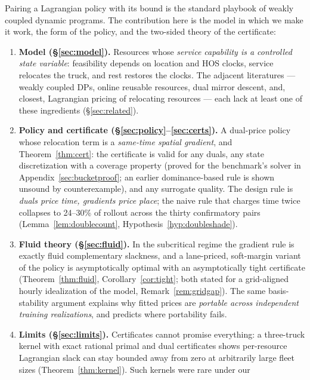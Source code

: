 \documentclass[11pt]{article}
\begin{document}
Pairing a Lagrangian policy with its bound is the standard playbook of
weakly coupled dynamic programs. The contribution here is the model in
which we make it work, the form of the policy, and the two-sided theory
of the certificate:

\begin{enumerate}
\item \textbf{Model (\S\ref{sec:model}).} Resources whose \emph{service
  capability is a controlled state variable}: feasibility depends on
  location and HOS clocks, service relocates the truck, and rest
  restores the clocks. The adjacent literatures --- weakly coupled
  DPs, online reusable resources, dual mirror descent, and, closest,
  Lagrangian pricing of relocating resources
  \citep{balseirobrownchen2021relocating} --- each lack at
  least one of these ingredients (\S\ref{sec:related}).
\item \textbf{Policy and certificate
  (\S\ref{sec:policy}--\ref{sec:certs}).} A dual-price policy whose
  relocation term is a \emph{same-time spatial gradient}, and
  Theorem~\ref{thm:cert}: the certificate is valid for any duals, any
  state discretization with a coverage property (proved for the
  benchmark's solver in Appendix~\ref{sec:bucketproof}; an earlier
  dominance-based rule is shown unsound by counterexample), and any
  surrogate quality. The design
  rule is \emph{duals price time, gradients price place}; the naive
  rule that charges time twice collapses to 24--30\% of rollout
  across the thirty confirmatory pairs (Lemma~\ref{lem:doublecount},
  Hypothesis~\ref{hyp:doubleshade}).
\item \textbf{Fluid theory (\S\ref{sec:fluid}).} In the subcritical
  regime the gradient rule is exactly fluid complementary slackness,
  and a lane-priced, soft-margin variant of the policy is
  asymptotically optimal with an asymptotically tight certificate
  (Theorem~\ref{thm:fluid}, Corollary~\ref{cor:tight}; both stated
  for a grid-aligned hourly idealization of the model,
  Remark~\ref{rem:gridgap}). The same
  basis-stability argument explains why fitted prices are
  \emph{portable across independent training realizations}, and
  predicts where portability fails.
\item \textbf{Limits (\S\ref{sec:limits}).} Certificates cannot
  promise everything: a three-truck kernel with exact rational primal
  and dual certificates shows per-resource Lagrangian slack can stay
  bounded away from zero at arbitrarily large fleet sizes
  (Theorem~\ref{thm:kernel}). Such kernels were rare under our

\end{enumerate}
\end{document}

